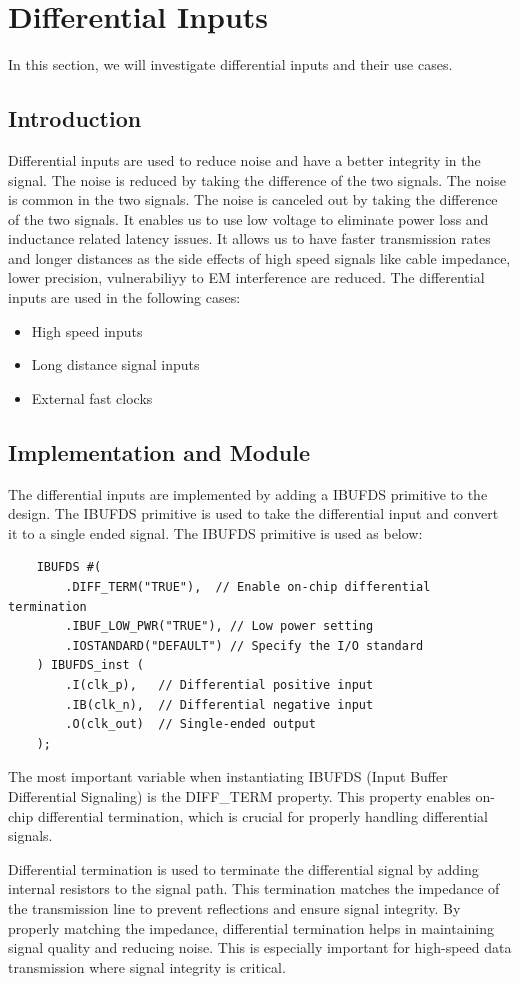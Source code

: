 \documentclass{report}
\begin{document}
\section{Differential Inputs}
In this section, we will investigate differential inputs and their use cases.
\subsection{Introduction}
Differential inputs are used to reduce noise and have a better integrity in the signal. The noise is reduced by taking the difference of the two signals. The noise is common in the two signals. The noise is canceled out by taking the difference of the two signals. It enables us to use low voltage to eliminate power loss and inductance related latency issues. It allows us to have faster transmission rates and longer distances as the side effects of high speed signals like cable impedance, lower precision, vulnerabiliyy to EM interference are reduced. The differential inputs are used in the following cases:
\begin{itemize}
    \item High speed inputs
    \item Long distance signal inputs
    \item External fast clocks
\end{itemize}
\subsection{Implementation and Module}
The differential inputs are implemented by adding a IBUFDS primitive to the design. The IBUFDS primitive is used to take the differential input and convert it to a single ended signal. The IBUFDS primitive is used as below:
\begin{verbatim}
    IBUFDS #(
        .DIFF_TERM("TRUE"),  // Enable on-chip differential termination
        .IBUF_LOW_PWR("TRUE"), // Low power setting
        .IOSTANDARD("DEFAULT") // Specify the I/O standard
    ) IBUFDS_inst (
        .I(clk_p),   // Differential positive input
        .IB(clk_n),  // Differential negative input
        .O(clk_out)  // Single-ended output
    );
\end{verbatim}
The most important variable when instantiating IBUFDS (Input Buffer Differential Signaling) is the DIFF\_TERM property. This property enables on-chip differential termination, which is crucial for properly handling differential signals.

Differential termination is used to terminate the differential signal by adding internal resistors to the signal path. This termination matches the impedance of the transmission line to prevent reflections and ensure signal integrity. By properly matching the impedance, differential termination helps in maintaining signal quality and reducing noise. This is especially important for high-speed data transmission where signal integrity is critical.
\end{document}
